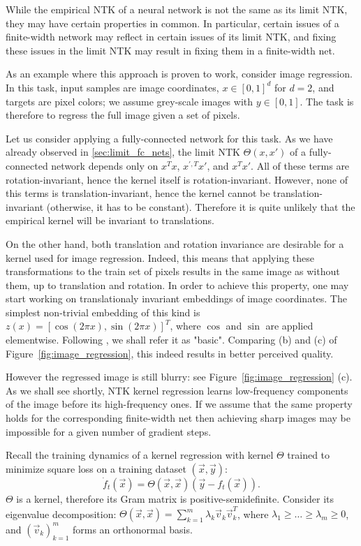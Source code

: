 \documentclass{article}
\begin{document}
    While the empirical NTK of a neural network is not the same as its limit NTK, they may have certain properties in common.
    In particular, certain issues of a finite-width network may reflect in certain issues of its limit NTK, and fixing these issues in the limit NTK may result in fixing them in a finite-width net.

    As an example where this approach is proven to work, consider image regression.
    In this task, input samples are image coordinates, $x \in [0,1]^d$ for $d=2$, and targets are pixel colors; we assume grey-scale images with $y \in [0,1]$.
    The task is therefore to regress the full image given a set of pixels.

    Let us consider applying a fully-connected network for this task.
    As we have already observed in \cref{sec:limit_fc_nets}, the limit NTK $\Theta(x,x')$ of a fully-connected network depends only on $x^T x$, $x^{\prime,T} x'$, and $x^T x'$.
    All of these terms are rotation-invariant, hence the kernel itself is rotation-invariant.
    However, none of this terms is translation-invariant, hence the kernel cannot be translation-invariant (otherwise, it has to be constant).
    Therefore it is quite unlikely that the empirical kernel will be invariant to translations.

    On the other hand, both translation and rotation invariance are desirable for a kernel used for image regression.
    Indeed, this means that applying these transformations to the train set of pixels results in the same image as without them, up to translation and rotation.
    In order to achieve this property, one may start working on translationaly invariant embeddings of image coordinates. 
    The simplest non-trivial embedding of this kind is $z(x) = [\cos(2\pi x), \sin(2\pi x)]^T$, where $\cos$ and $\sin$ are applied elementwise.
    Following \cite{tancik2020fourier}, we shall refer it as "basic".
    Comparing (b) and (c) of Figure~\ref{fig:image_regression}, this indeed results in better perceived quality.

    However the regressed image is still blurry: see Figure~\ref{fig:image_regression} (c).
    As we shall see shortly, NTK kernel regression learns low-frequency components of the image before its high-frequency ones.
    If we assume that the same property holds for the corresponding finite-width net then achieving sharp images may be impossible for a given number of gradient steps.

    Recall the training dynamics of a kernel regression with kernel $\Theta$ trained to minimize square loss on a training dataset $(\vec x, \vec y)$:
    \begin{equation}
        \dot f_t(\vec x)
        = \Theta(\vec x, \vec x) (\vec y - f_t(\vec x)).
    \end{equation}
    $\Theta$ is a kernel, therefore its Gram matrix is positive-semidefinite.
    Consider its eigenvalue decomposition: $\Theta(\vec x, \vec x) = \sum_{k=1}^m \lambda_k \vec v_k \vec v_k^T$, where $\lambda_1 \geq \ldots \geq \lambda_m \geq 0$, and $(\vec v_k)_{k=1}^m$ forms an orthonormal basis.
\end{document}
